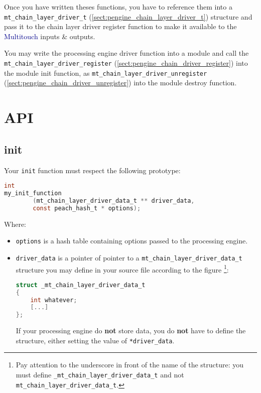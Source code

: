 Once you have written theses functions, you have to reference them
into a \texttt{mt\_chain\_layer\_driver\_t} 
(\ref{sect:pengine_chain_layer_driver_t}) structure and pass it to the chain 
layer driver register function to make it available to the 
\textcolor{darkblue}{Multitouch} inputs \& outputs.

You may write the processing engine driver function into a module and
call the \texttt{mt\_chain\_layer\_driver\_register} 
(\ref{sect:pengine_chain_driver_register}) into the module init 
function, as \texttt{mt\_chain\_layer\_driver\_unregister}
(\ref{sect:pengine_chain_driver_unregister}) into the module 
destroy function.

%
%
\section{API}

%
%
\subsection{init}
\label{sect:pengine_init}

Your \texttt{init} function must respect the following prototype: 
\begin{lstlisting}[language=C, 
caption=Processing engine's init function prototype]
int 
my_init_function
        (mt_chain_layer_driver_data_t ** driver_data, 
        const peach_hash_t * options);
\end{lstlisting}
Where: 
\begin{itemize}
\item \texttt{options} is a hash table containing options passed 
to the processing engine.
\item \texttt{driver\_data} is a pointer of pointer to a 
\texttt{mt\_chain\_layer\_driver\_data\_t} structure you may define in 
your source file according to the figure \footnote{Pay attention 
to the underscore in front of the name of the structure: you must define 
\texttt{\_mt\_chain\_layer\_driver\_data\_t} and not
\texttt{mt\_chain\_layer\_driver\_data\_t}.}:
\begin{lstlisting}[language=C,
caption=Processing engine's \_mt\_chain\_layer\_driver\_data\_t structure]
struct _mt_chain_layer_driver_data_t
{
    int whatever;
    [...]
};
\end{lstlisting}
If your processing engine do \textbf{not} store data, you do \textbf{not} have 
to define the structure, either setting the value of \texttt{*driver\_data}.
\end{itemize}

